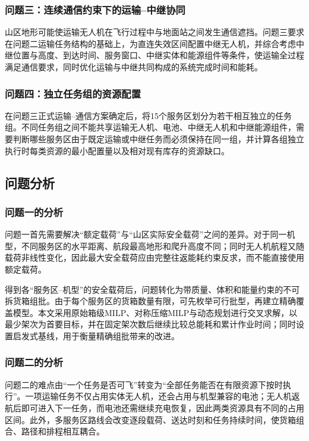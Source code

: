 \documentclass[UTF8,a4paper,12pt]{ctexart}
\begin{document}
\subsubsection{问题三：连续通信约束下的运输--中继协同}

山区地形可能使运输无人机在飞行过程中与地面站之间发生通信遮挡。问题三要求在问题二运输任务结构的基础上，为直连失效区间配置中继无人机，并综合考虑中继位置与高度、到达时间、服务窗口、中继实体和能源组件等条件，使运输全过程满足通信要求，同时优化运输与中继共同构成的系统完成时间和能耗。

\subsubsection{问题四：独立任务组的资源配置}

在问题三正式运输--通信方案确定后，将15个服务区划分为若干相互独立的任务组。不同任务组之间不能共享运输无人机、电池、中继无人机和中继能源组件，需要判断哪些服务区由于既定运输或中继任务而必须保持在同一组，并计算各组独立执行时每类资源的最小配置量以及相对现有库存的资源缺口。

\subsection{问题分析}

\subsubsection{问题一的分析}

问题一首先需要解决“额定载荷”与“山区实际安全载荷”之间的差异。对于同一机型，不同服务区的水平距离、航段最高地形和爬升高度不同；同时无人机航程又随载荷非线性变化，因此最大安全载荷应由完整往返能耗约束反求，而不能直接使用额定载荷。

得到各“服务区--机型”的安全载荷后，问题转化为带质量、体积和能量约束的不可拆货箱组批。由于每个服务区的货箱数量有限，可先枚举可行批型，再建立精确覆盖模型。本文采用原始箱级MILP、对称压缩MILP与动态规划进行交叉求解，以最少架次为首要目标，并在固定架次数后继续比较总能耗和累计作业时间；同时设置启发式基线，用于衡量精确组批带来的改进。

\subsubsection{问题二的分析}

问题二的难点由“一个任务是否可飞”转变为“全部任务能否在有限资源下按时执行”。一项运输任务不仅占用实体无人机，还会占用与机型兼容的电池；无人机返航后即可进入下一任务，而电池还需继续充电恢复，因此两类资源具有不同的占用区间。此外，多服务区路线会改变逐段载荷、送达时刻和任务持续时间，使货箱组合、路径和排程相互耦合。
\end{document}
